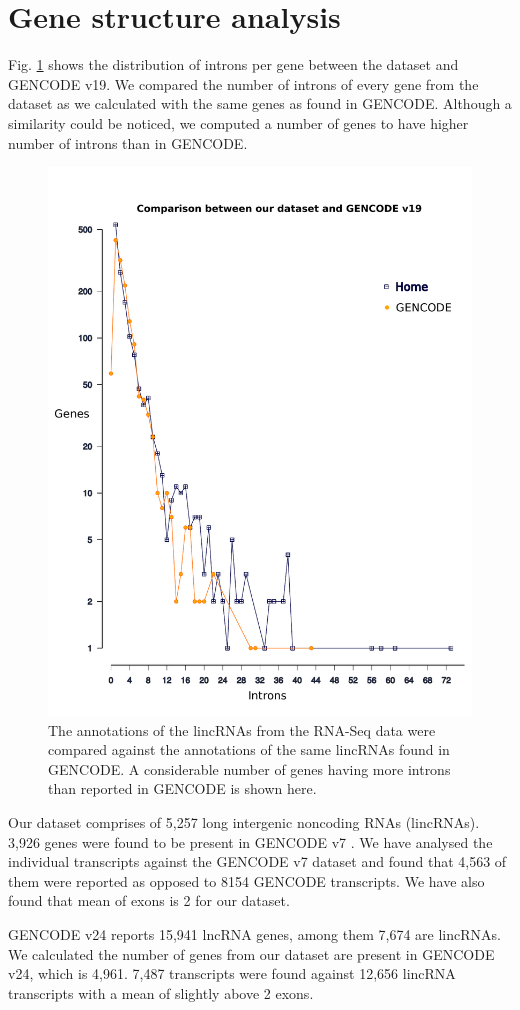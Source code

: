 \documentclass[ncrna,article,submit,moreauthors,pdftex,10pt,a4paper]{mdpi}
\begin{document}
\section{Gene structure analysis}

Fig. \ref{comparison} shows the distribution of introns per gene between the dataset and GENCODE v19. We compared the number of introns of every gene from the dataset as we calculated with the same genes as found in GENCODE. Although a similarity could be noticed, we computed a number of genes to have higher number of introns than in GENCODE.
\begin{figure}[H]
 \centering
 \includegraphics[height = 12 cm, width=14 cm]{comparison_plot_2}
 \caption{The annotations of the lincRNAs from the RNA-Seq data were compared against the annotations of the same lincRNAs found in GENCODE. A considerable number of genes having more introns than reported in GENCODE is shown here.}
 \label{comparison}
\end{figure}

Our dataset comprises of 5,257 long intergenic noncoding RNAs (lincRNAs). 3,926 genes were found to be present in GENCODE v7 \cite{harrow2012}. We have analysed the individual transcripts against the GENCODE v7 dataset and found that 4,563 of them were reported as opposed to 8154 GENCODE transcripts. We have also found that mean of exons is 2 for our dataset.

GENCODE v24 reports 15,941 lncRNA genes, among them 7,674 are lincRNAs. We calculated the number of genes from our dataset are present in GENCODE v24, which is 4,961. 7,487 transcripts were found against 12,656 lincRNA transcripts with a mean of slightly above 2 exons.



\end{document}
